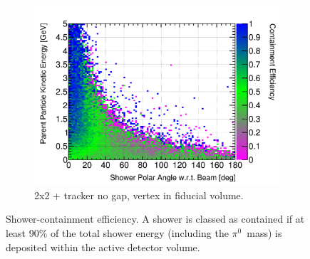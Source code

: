 \documentclass[10pt,a4paper,openany]{article}
\begin{document}
\begin{figure}[htbp]
\begin{subfigure}[b]{0.49\textwidth}
		\includegraphics[width=1.0\textwidth]{Pi0_cont_eff_2x2_Scintillator_fiducial.png}
		\caption{2x2 + tracker no gap, vertex in fiducial volume.}
		\label{}
	\end{subfigure}	
  \caption{Shower-containment efficiency. A shower is classed as contained if at least 90\% of the total shower energy (including the $\pi^{0}$~mass) is deposited within the active detector volume.}
\end{figure}
\end{document}
